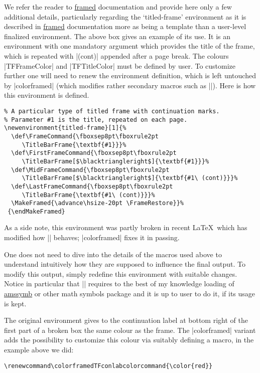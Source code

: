 \documentclass[a4paper,dvipdfmx,11pt]{article}
\def\ctanpackage#1{\href{https://ctan.org/pkg/#1}{#1}}
\def\colorframedTFconlabcolorcommand{\color{red}}
\begin{document}
\begin{shaded*}
  We refer the reader to \ctanpackage{framed} documentation
  and provide here only a few additional details, particularly
  regarding the `titled-frame' environment as it is described
  in \ctanpackage{framed} documentation more as being a
  template than a user-level finalized environment.  The above
  box gives an example of its use.  It is an environment with
  one mandatory argument which provides the title of the
  frame, which is repeated with |(cont)| appended after a page
  break.  The colours |TFFrameColor| and |TFTitleColor| must
  be defined by user.  To customize further one will need to
  renew the environment definition, which is left untouched by
  |colorframed| (which modifies rather secondary macros such
  as |\TitleBarFrame|).  Here is how this environment is
  defined.
\color{RawSienna}
\begin{verbatim}
% A particular type of titled frame with continuation marks.  
% Parameter #1 is the title, repeated on each page.
\newenvironment{titled-frame}[1]{%
  \def\FrameCommand{\fboxsep8pt\fboxrule2pt
     \TitleBarFrame{\textbf{#1}}}%
  \def\FirstFrameCommand{\fboxsep8pt\fboxrule2pt
     \TitleBarFrame[$\blacktriangleright$]{\textbf{#1}}}%
  \def\MidFrameCommand{\fboxsep8pt\fboxrule2pt
     \TitleBarFrame[$\blacktriangleright$]{\textbf{#1\ (cont)}}}%
  \def\LastFrameCommand{\fboxsep8pt\fboxrule2pt
     \TitleBarFrame{\textbf{#1\ (cont)}}}%
  \MakeFramed{\advance\hsize-20pt \FrameRestore}}%
 {\endMakeFramed}
\end{verbatim}
\begin{footnotesize}\normalcolor
As a side note, this environment was partly
broken in recent \LaTeX\ which has modified how |\smash|
behaves; |colorframed| fixes it in passing.\par
\end{footnotesize}
\color{ForestGreen}
  One does not need to dive into the details of the macros
  used above to understand intuitively how they are supposed
  to influence the final output.  To modify this output,
  simply redefine this environment with suitable changes.
  Notice in particular that |\blacktriangleright| requires to
  the best of my knowledge loading of \ctanpackage{amssymb} or
  other math symbols package and it is up to user to do it, if
  its usage is kept.

The original environment gives to the continuation label at
bottom right of the first part of a broken box the same colour
as the frame.  The |colorframed| variant adds the possibility
to customize this colour via suitably defining a macro, in the
example above we did:\color{RawSienna}
\begin{verbatim}
\renewcommand\colorframedTFconlabcolorcommand{\color{red}}
\end{verbatim}
\end{shaded*}
\end{document}
